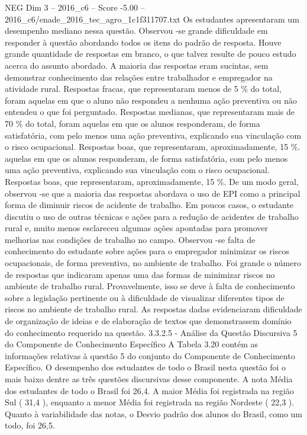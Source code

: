 \begin{textsample}{NEG Dim 3 – 2016\_c6 – Score -5.00 – 2016\_c6/enade\_2016\_tec\_agro\_1c1f311707.txt}
Os estudantes apresentaram um desempenho mediano nessa questão.
Observou -se grande dificuldade em responder à questão abordando todos os itens do padrão de resposta.
Houve grande quantidade de respostas em branco, o que talvez resulte de pouco estudo acerca do assunto abordado.
A maioria das respostas eram sucintas, sem demonstrar conhecimento das relações entre trabalhador e empregador na atividade rural.
Respostas fracas, que representaram menos de 5 \% do total, foram aquelas em que o aluno não respondeu a nenhuma ação preventiva ou não entendeu o que foi perguntado.
Respostas medianas, que representaram mais de 70 \% do total, foram aquelas em que os alunos responderam, de forma satisfatória, com pelo menos uma ação preventiva, explicando sua vinculação com o risco ocupacional.
Respostas boas, que representaram, aproximadamente, 15 \%. aquelas em que os alunos responderam, de forma satisfatória, com pelo menos uma ação preventiva, explicando sua vinculação com o risco ocupacional.
Respostas boas, que representaram, aproximadamente, 15 \%.
De um modo geral, observou -se que a maioria das respostas abordava o uso de EPI como a principal forma de diminuir riscos de acidente de trabalho.
Em poucos casos, o estudante discutiu o uso de outras técnicas e ações para a redução de acidentes de trabalho rural e, muito menos esclareceu algumas ações apontadas para promover melhorias nas condições de trabalho no campo.
Observou -se falta de conhecimento do estudante sobre ações para o empregador minimizar os riscos ocupacionais, de forma preventiva, no ambiente de trabalho.
Foi grande o número de respostas que indicaram apenas uma das formas de minimizar riscos no ambiente de trabalho rural.
Provavelmente, isso se deve à falta de conhecimento sobre a legislação pertinente ou à dificuldade de visualizar diferentes tipos de riscos no ambiente de trabalho rural.
As respostas dadas evidenciaram dificuldade de organização de ideias e de elaboração de textos que demonstrassem domínio do conhecimento requerido na questão. 3.3.2.5 - Análise da Questão Discursiva 5 do Componente de Conhecimento Específico A Tabela 3.20 contém as informações relativas à questão 5 do conjunto do Componente de Conhecimento Específico.
O desempenho dos estudantes de todo o Brasil nesta questão foi o mais baixo dentre as três questões discursivas desse componente.
A nota Média dos estudantes de todo o Brasil foi 26,4.
A maior Média foi registrada na região Sul ( 31,4 ), enquanto a menor Média foi registrada na região Nordeste ( 22,3 ).
Quanto à variabilidade das notas, o Desvio padrão dos alunos do Brasil, como um todo, foi 26,5.

\end{textsample}
